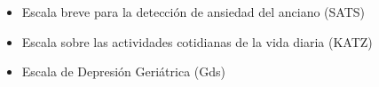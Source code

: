 \begin{itemize}
\item {Escala breve para la detecci\'on de ansiedad del anciano (SATS)} 
\cite{Vargas11}

\item {Escala sobre las actividades cotidianas de la vida diaria (KATZ)} 
\cite{Roumec14}

\item {Escala de Depresi\'on Geri\'atrica (Gds)} 
\cite{Greenberg12,Cuijpers13}

\end{itemize}

